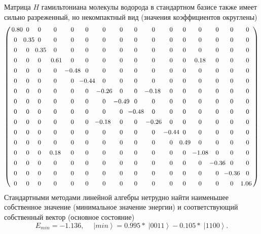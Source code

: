 \documentclass[a4paper]{report}
\newcommand{\ket}[1] {\!\!\;\ensuremath{\left|#1\right\rangle}}
\begin{document}
Матрица $H$ гамильтониана молекулы водорода в стандартном базисе также имеет сильно разреженный, но некомпактный вид (значения коэффициентов округлены)
\begin{equation}\label{matr-Pauli}
\small{\left(\!\!
\begin{array}{cccccccccccccccc}
0.80\!\!\!\!\!&\;0&\;0&\;0&\;0&\;0&\;0&\;0    &\;0&\;0&\;0&\;0&\;0&\;0&\;0&\;0 \\[4pt]
\;0&\!0.35\!\!\!\!\!&\;0&\;0&\;0&\;0&\;0&\;0    &\;0&\;0&\;0&\;0&\;0&\;0&\;0&\;0 \\[4pt]
\;0&\;0&\!0.35\!\!\!\!\!&\;0&\;0&\;0&\;0&\;0    &\;0&\;0&\;0&\;0&\;0&\;0&\;0&\;0 \\[4pt]
\;0&\;0&\;0&\!0.61\!\!\!\!\!&\;0&\;0&\;0&\;0    &\;0&\;0&\;0&\;0&\;0.18&\;0&\;0&\;0 \\[4pt]
\;0&\;0&\;0&\;0&\!\!\!-0.48\!\!\!\!\!&\;0&\;0&\;0   &\;0&\;0&\;0&\;0&\;0&\;0&\;0&\;0  \\[4pt]
\;0&\;0&\;0&\;0&\;0&\!\!\!-0.44\!\!\!\!\!&\;0&\;0   &\;0&\;0&\;0&\;0&\;0&\;0&\;0&\;0  \\[4pt]
\;0&\;0&\;0&\;0&\;0&\;0&\!\!\!-0.26\!\!\!\!\!&\;0   &\;0&\!-0.18\!&\;0&\;0&\;0&\;0&\;0&\;0  \\[4pt]
\;0&\;0&\;0&\;0&\;0&\;0&\;0&\!\!\!-0.49\!\!\!\!\!   &\;0&\;0&\;0&\;0&\;0&\;0&\;0&\;0 \\[4pt]
\;0&\;0&\;0&\;0&\;0&\;0&\;0&\;0   &\!\!\!-0.48\!\!\!\!\!&\;0&\;0&\;0&\;0&\;0&\;0&\;0   \\[4pt] \;0&\;0&\;0&\;0&\;0&\;0&\!\!-0.18\!&\;0&\;0   &\!\!\!-0.26\!\!\!\!\!&\;0&\;0&\;0&\;0&\;0&\;0  \\[4pt]
\;0&\;0&\;0&\;0&\;0&\;0&\;0&\;0   &\;0&\;0&\!\!\!-0.44\!\!\!\!\!&\;0&\;0&\;0&\;0&\;0   \\[4pt]
\;0&\;0&\;0&\;0&\;0&\;0&\;0&\;0   &\;0&\;0&\;0&\!\!0.49\!\!\!\!\!&\;0&\;0&\;0&\;0   \\[4pt]
\;0&\;0&\;0&\;0.18&\;0&\;0&\;0&\;0   &\;0&\;0&\;0&\;0&\!\!\!-1.08\!\!\!\!\!&\;0&\;0&\;0   \\[4pt]
\;0&\;0&\;0&\;0&\;0&\;0&\;0&\;0   &\;0&\;0&\;0&\;0&\;0&\!\!\!-0.36\!\!\!\!\!&\;0&\;0   \\[4pt]
\;0&\;0&\;0&\;0&\;0&\;0&\;0&\;0   &\;0&\;0&\;0&\;0&\;0&\;0&\!\!\!-0.36\!\!\!\!\!&\;0   \\[4pt]
\;0&\;0&\;0&\;0&\;0&\;0&\;0&\;0   &\;0&\;0&\;0&\;0&\;0&\;0&\;0&\!1.06
\end{array}    \!\!\right)}
\nonumber
\end{equation}
Стандартными методами линейной алгебры нетрудно найти наименьшее собственное значение (минимальное значение энергии) и соответствующий собственный вектор (основное состояние)
\begin{equation}\label{Emin-state}
E_{min}= - 1.136,\quad \ket{min}= 0.995*\ket{0011}- 0.105*\ket{1100}.
\nonumber
\end{equation}
\end{document}
